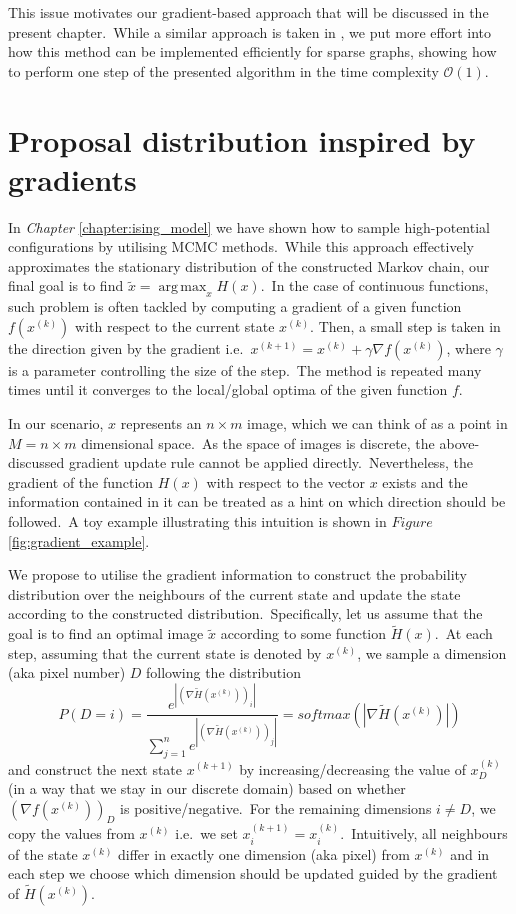 \documentclass[shortabstract, english, lic]{iithesis}
\DeclareMathOperator*{\argmax}{arg\,max}
\theoremstyle{default_theorem_style}\newtheorem{theorem}{Theorem}
\theoremstyle{default_theorem_style}\newtheorem{definition}{Definition}
\begin{document}
\noindent This issue motivates our gradient-based approach
that will be discussed in the present chapter.\ While a similar approach is taken in \cite{oops_gradient}, we put
more effort into how this method can be implemented efficiently for sparse graphs, showing how to perform one
step of the presented algorithm in the time complexity $\mathcal{O}(1)$.

\section{Proposal distribution inspired by gradients}

In \textit{Chapter} \ref{chapter:ising_model} we have shown how to sample high-potential configurations by
utilising MCMC methods.\ While this approach effectively approximates the stationary distribution of the constructed
Markov chain, our final goal is to find $\tilde{x} = \argmax_x H(x)$.\ In the case of continuous functions, such problem
is often tackled by computing a gradient of a given function $f(x^{(k)})$ with respect to the current state $x^{(k)}$.
Then, a small step is taken in the direction given by the gradient
i.e.\ $x^{(k + 1)} = x^{(k)} + \gamma \nabla f(x^{(k)})$, where $\gamma$ is a parameter
controlling the size of the step.\ The method is repeated many times until it converges to the local/global optima of
the given function $f$.\newline

\noindent In our scenario, $x$ represents an $n \times m$ image, which we can think of as a point in
$M = n \times m$ dimensional space.\ As the space of images is discrete, the above-discussed gradient update rule
cannot be applied directly.\ Nevertheless, the gradient of the function $H(x)$ with respect to the vector $x$ exists
and the information contained in it can be treated as a hint on which direction should be followed.\ A toy example
illustrating this intuition is shown in $Figure$ \ref{fig:gradient_example}.\newline

\noindent We propose to utilise the gradient information to construct the probability distribution over the
neighbours of the current state and update the state according to the constructed distribution.\ Specifically, let
us assume that the goal is to find an optimal image $\tilde{x}$ according to some function $\tilde{H}(x)$.\ At each
step, assuming that the current state is denoted by $x^{(k)}$, we sample a dimension (aka pixel number) $D$
following the distribution
$$
P(D = i) = \frac{e^{|(\nabla \tilde{H}(x^{(k)}))_i|}}{\sum\limits_{j = 1}^{n}
e^{|(\nabla \tilde{H}(x^{(k)}))_j|}} = softmax(|\nabla \tilde{H}(x^{(k)})|)
$$
and construct the next state $x^{(k + 1)}$ by increasing/decreasing the value of
$x^{(k)}_D$ (in a way that we stay in our discrete domain) based on whether $(\nabla f(x^{(k)}))_D$ is
positive/negative.\ For the remaining dimensions $i \neq D$, we copy the values from
$x^{(k)}$ i.e.\ we set $x^{(k + 1)}_i = x^{(k)}_i$.\ Intuitively, all neighbours of the state $x^{(k)}$
differ in exactly one dimension (aka pixel) from $x^{(k)}$ and in each step we choose which dimension
should be updated guided by the gradient of $\tilde{H}(x^{(k)})$.\newline
\end{document}
